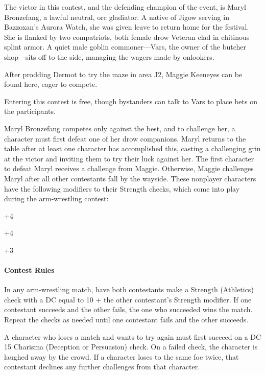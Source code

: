 \documentclass[10pt,a4paper,twoside,bg=print,twocolumn,openany,nodeprecatedcode]{dndbook}
\begin{document}
The victor in this contest, and the defending champion of the event, is Maryl Bronzefang, a lawful neutral, orc gladiator. A native of Jigow serving in Bazzoxan's Aurora Watch, she was given leave to return home for the festival. She is flanked by two compatriots, both female drow Veteran clad in chitinous splint armor. A quiet male goblin commoner—Vars, the owner of the butcher shop—sits off to the side, managing the wagers made by onlookers.

After prodding Dermot to try the maze in area J2, Maggie Keeneyes can be found here, eager to compete.

Entering this contest is free, though bystanders can talk to Vars to place bets on the participants.

Maryl Bronzefang competes only against the best, and to challenge her, a character must first defeat one of her drow companions. Maryl returns to the table after at least one character has accomplished this, casting a challenging grin at the victor and inviting them to try their luck against her. The first character to defeat Maryl receives a challenge from Maggie. Otherwise, Maggie challenges Maryl after all other contestants fall by the wayside. These nonplayer characters have the following modifiers to their Strength checks, which come into play during the arm-wrestling contest:


\begin{description}[nolistsep]
\item[Maggie Keeneyes:]
+4
\item[Maryl Bronzefang:]
+4
\item[Female Drow:]
+3
\end{description}

\paragraph{Contest Rules}
In any arm-wrestling match, have both contestants make a Strength (Athletics) check with a DC equal to 10 + the other contestant's Strength modifier. If one contestant succeeds and the other fails, the one who succeeded wins the match. Repeat the checks as needed until one contestant fails and the other succeeds.

A character who loses a match and wants to try again must first succeed on a DC 15 Charisma (Deception or Persuasion) check. On a failed check, the character is laughed away by the crowd. If a character loses to the same foe twice, that contestant declines any further challenges from that character.
\end{document}

